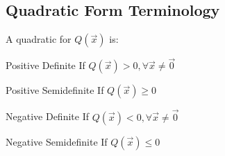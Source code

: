 \documentclass[5pt]{article}
\begin{document}
\begin{multicols}{2}
\subsection{Quadratic Form Terminology}
A quadratic for $Q(\vec{x})$ is:
\begin{itemize*}
  \item Positive Definite If $Q(\vec{x})>0,\forall\vec{x}\ne\vec{0}$
  \item Positive Semidefinite If $Q(\vec{x})\ge 0$
  \item Negative Definite If $Q(\vec{x})<0,\forall\vec{x}\ne\vec{0}$
  \item Negative Semidefinite If $Q(\vec{x})\le 0$
\end{itemize*}


\end{multicols}
\end{document}
